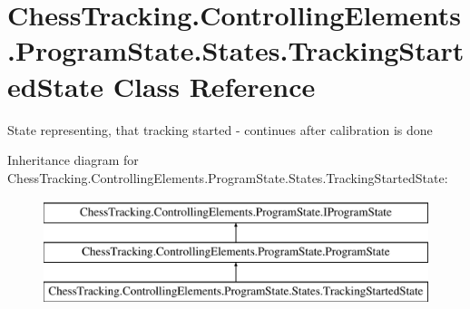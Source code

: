 \hypertarget{class_chess_tracking_1_1_controlling_elements_1_1_program_state_1_1_states_1_1_tracking_started_state}{}\section{Chess\+Tracking.\+Controlling\+Elements.\+Program\+State.\+States.\+Tracking\+Started\+State Class Reference}
\label{class_chess_tracking_1_1_controlling_elements_1_1_program_state_1_1_states_1_1_tracking_started_state}


State representing, that tracking started -\/ continues after calibration is done  


Inheritance diagram for Chess\+Tracking.\+Controlling\+Elements.\+Program\+State.\+States.\+Tracking\+Started\+State\+:\begin{figure}[H]
\begin{center}
\leavevmode
\includegraphics[height=3.000000cm]{class_chess_tracking_1_1_controlling_elements_1_1_program_state_1_1_states_1_1_tracking_started_state}
\end{center}
\end{figure}
